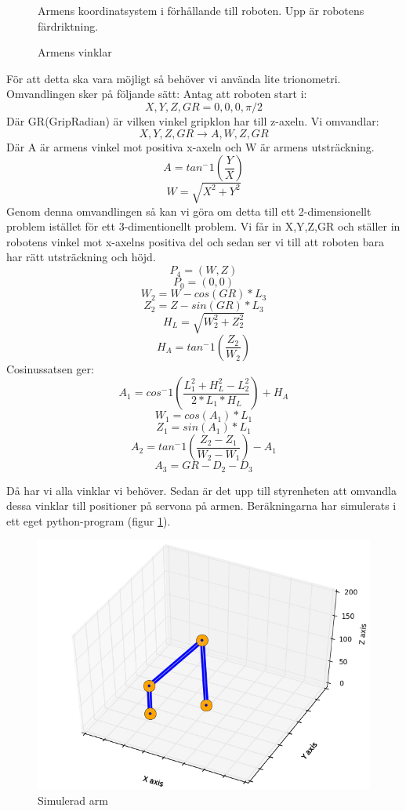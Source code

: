  \begin{figure}[H]
 \centerline{}
 \caption{Armens koordinatsystem i förhållande till roboten. Upp är robotens färdriktning.}
 \end{figure}

 \begin{figure}[H]
\centerline{}
\caption{Armens vinklar}
\end{figure}

 För att detta ska vara möjligt så behöver vi använda lite trionometri. Omvandlingen sker på följande sätt:
Antag att roboten start i: $$X,Y,Z,GR=0,0,0,\pi/2$$
Där GR(GripRadian) är vilken vinkel gripklon har till z-axeln.\newline
Vi omvandlar:$$ X,Y,Z,GR\rightarrow A,W,Z,GR$$ 
Där A är armens vinkel mot positiva x-axeln och W är armens utsträckning.
$$A=tan^-1(\dfrac{Y}{X}) $$
$$W=\sqrt{X^2+Y^2}$$
Genom denna omvandlingen så kan vi göra om detta till ett 2-dimensionellt problem istället för ett 3-dimentionellt problem. Vi får in X,Y,Z,GR och ställer in robotens vinkel mot x-axelns positiva del och sedan ser vi till att roboten bara har rätt utsträckning och höjd.
$$P_4=(W,Z)$$
$$P_0=(0,0)$$
$$W_2=W-cos(GR)*L_3$$
$$Z_2=Z-sin(GR)*L_3$$
$$H_L=\sqrt{W_2^2+Z_2^2}$$
$$H_A=tan^-1(\dfrac{Z_2}{W_2})$$
Cosinussatsen ger:
$$A_1=cos^-1(\dfrac{L_1^2+H_L^2-L_2^2}{2*L_1*H_L})+H_A$$
$$W_1=cos(A_1)*L_1$$
$$Z_1=sin(A_1)*L_1$$
$$A_2=tan^-1(\dfrac{Z_2-Z_1}{W_2-W_1})-A_1$$
$$A_3=GR-D_2-D_3$$

Då har vi alla vinklar vi behöver. Sedan är det upp till styrenheten att omvandla dessa vinklar till positioner på servona på armen.
Beräkningarna har simulerats i ett eget python-program (figur \ref{designspec-huvud-sim-arm}).
\begin{figure}[H]
\center
\includegraphics[scale=0.55]{simulator}
\caption{Simulerad arm} \label{designspec-huvud-sim-arm}
\end{figure}

